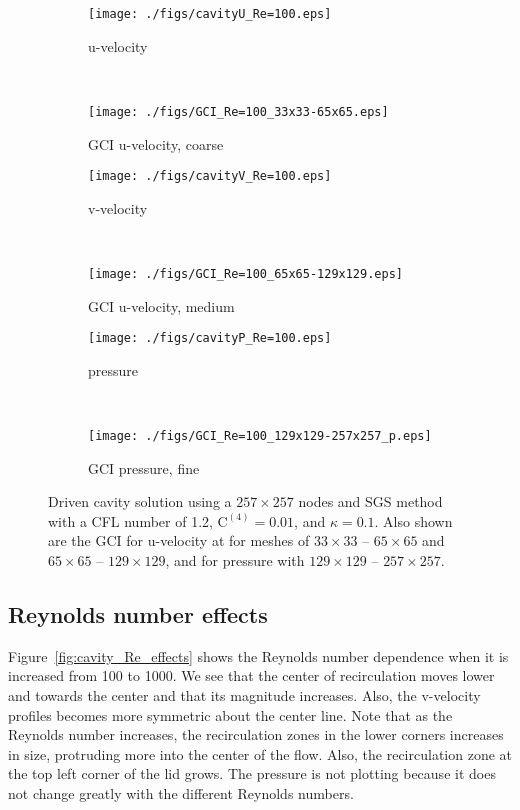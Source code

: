 \documentclass[10pt, letterpaper]{article}
\newcommand{\mesh}[1]{${#1} \times {#1}$}
\begin{document}
\begin{figure}[hb]
	\centering
	\begin{subfigure}[b]{0.475\textwidth}
		\centering
		\texttt{[image: ./figs/cavityU\_Re=100.eps]}
		\caption{u-velocity}
	\end{subfigure}
	~
	\begin{subfigure}[b]{0.475\textwidth}
		\centering
		\texttt{[image: ./figs/GCI\_Re=100\_33x33-65x65.eps]}
		\caption{GCI u-velocity, coarse}
	\end{subfigure}
	
	\begin{subfigure}[b]{0.475\textwidth}
		\centering
		\texttt{[image: ./figs/cavityV\_Re=100.eps]}
		\caption{v-velocity}
	\end{subfigure}
	~
	\begin{subfigure}[b]{0.475\textwidth}
		\centering
		\texttt{[image: ./figs/GCI\_Re=100\_65x65-129x129.eps]}
		\caption{GCI u-velocity, medium}
		
	\end{subfigure}
		\begin{subfigure}[b]{0.475\textwidth}
		\centering
		\texttt{[image: ./figs/cavityP\_Re=100.eps]}
		\caption{pressure}
	\end{subfigure}
	~
	\begin{subfigure}[b]{0.475\textwidth}
		\centering
		\texttt{[image: ./figs/GCI\_Re=100\_129x129-257x257\_p.eps]}
		\caption{GCI pressure, fine}
	\end{subfigure}
	
	\caption{Driven cavity solution using a \mesh{257} nodes and SGS method with
		a CFL number of 1.2, $\mathrm{C^{(4)}}=0.01$, and $\kappa=0.1$.
		Also shown are the GCI for u-velocity at for meshes of 
		\mesh{33} -- \mesh{65} and \mesh{65} -- \mesh{129}, and for pressure with
		\mesh{129} -- \mesh{257}.}
	\label{fig:cavity_100}
\end{figure}


\subsection{Reynolds number effects}

Figure~\ref{fig:cavity_Re_effects} shows the Reynolds number dependence when it is 
increased from 100 to 1000.  We see that the center of recirculation
moves lower and towards the center and that its magnitude increases.  Also,
the v-velocity profiles becomes more symmetric about the center line.  Note that
as the Reynolds number increases, the recirculation zones in the lower corners
increases in size, protruding more into the center of the flow.  Also, the 
recirculation zone at the top left corner of the lid grows.  
The pressure is not plotting
because it does not change greatly with the different Reynolds numbers.
\end{document}
